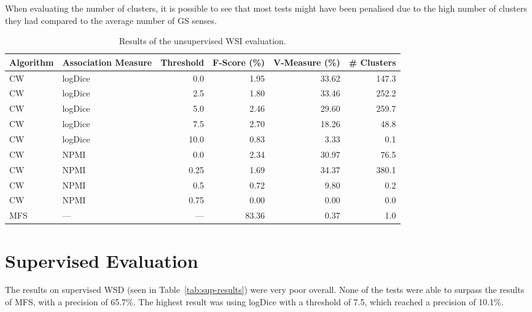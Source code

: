 When evaluating the number of clusters, it is possible to see that most tests
might have been penalised due to the high number of clusters they had compared
to the average number of \ac{GS} senses.

\begin{table}[ht]
\caption{Results of the unsupervised \ac*{WSI} evaluation.}
\label{tab:unsup-results}
\begin{tabu} to \textwidth {Xlrrrr}
\hline
\textbf{Algorithm} & \textbf{Association Measure} & \textbf{Threshold} & \textbf{F-Score (\%)} & \textbf{V-Measure (\%)} & \textbf{\# Clusters} \\
\hline
\ac{CW} & logDice   &  0.0 &  1.95 & 33.62 & 147.3 \\
\ac{CW} & logDice   &  2.5 &  1.80 & 33.46 & 252.2 \\
\ac{CW} & logDice   &  5.0 &  2.46 & 29.60 & 259.7 \\
\ac{CW} & logDice   &  7.5 &  2.70 & 18.26 &  48.8 \\
\ac{CW} & logDice   & 10.0 &  0.83 &  3.33 &   0.1 \\
\hline
\ac{CW} & \ac{NPMI} & 0.0  &  2.34 & 30.97 &  76.5 \\
\ac{CW} & \ac{NPMI} & 0.25 &  1.69 & 34.37 & 380.1 \\
\ac{CW} & \ac{NPMI} & 0.5  &  0.72 &  9.80 &   0.2 \\
\ac{CW} & \ac{NPMI} & 0.75 &  0.00 &  0.00 &   0.0 \\
\hline
\ac{MFS} &      --- &  --- & 83.36 &  0.37 &   1.0 \\
\hline
\end{tabu}
\end{table}

\section{Supervised Evaluation}

The results on supervised \ac{WSD} (seen in Table~\ref{tab:sup-results}) were
very poor overall. None of the tests were able to surpass the results of
\ac{MFS}, with a precision of 65.7\%. The highest result was using logDice with
a threshold of 7.5, which reached a precision of 10.1\%.

